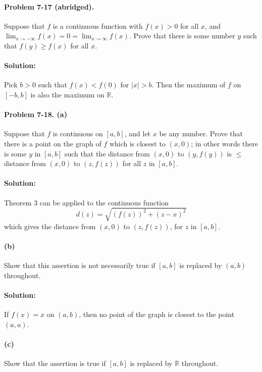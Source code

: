 \documentclass{article}
\begin{document}
\paragraph{Problem 7-17 (abridged).} Suppose that $f$ is a continuous function
with $f(x) > 0$ for all $x$, and $\lim_{x \rightarrow -\infty}f(x) = 0 = \lim_{
x \rightarrow \infty}f(x)$. Prove that there is some number $y$ such that $f(y)
\geq f(x)$ for all $x$.

\paragraph{Solution:} Pick $b > 0$ such that $f(x) < f(0)$ for $|x| > b$. Then
the maximum of $f$ on $[-b, b]$ is also the maximum on $\mathbb{R}$.

\paragraph{Problem 7-18. (a)} Suppose that $f$ is continuous on $[a, b]$, and
let $x$ be any number. Prove that there is a point on the graph of $f$ which
is closest to $(x, 0)$; in other words there is some $y$ in $[a, b]$ such that
the distance from $(x, 0)$ to $(y, f(y))$ is $\leq$ distance from $(x, 0)$ to
$(z, f(z))$ for all $z$ in $[a, b]$.

\paragraph{Solution:} Theorem 3 can be applied to the continuous function
\begin{equation*}
  d(z) = \sqrt{(f(z))^2 + (z - x)^2}
\end{equation*} which gives the distance from $(x, 0)$ to $(z, f(z))$, for $z$
in $[a, b]$.

\paragraph{(b)} Show that this assertion is not necessarily true if $[a, b]$
is replaced by $(a, b)$ throughout.

\paragraph{Solution:} If $f(x) = x$ on $(a, b)$, then no point of the graph is
closest to the point $(a, a)$.

\paragraph{(c)} Show that the assertion is true if $[a, b]$ is replaced by
$\mathbb{R}$ throughout.
\end{document}
